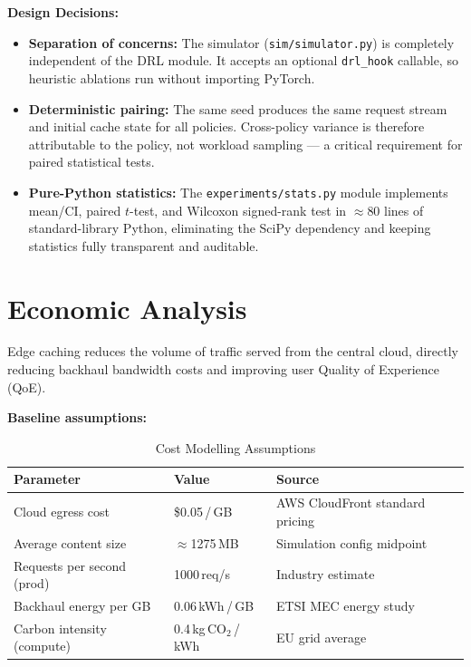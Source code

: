 \documentclass[12pt,a4paper]{report}
\begin{document}
\textbf{Design Decisions:}

\begin{itemize}
  \item \textbf{Separation of concerns:} The simulator (\texttt{sim/simulator.py}) is
        completely independent of the DRL module. It accepts an optional \texttt{drl\_hook}
        callable, so heuristic ablations run without importing PyTorch.
  \item \textbf{Deterministic pairing:} The same seed produces the same request stream
        and initial cache state for all policies. Cross-policy variance is therefore attributable
        to the policy, not workload sampling --- a critical requirement for paired statistical tests.
  \item \textbf{Pure-Python statistics:} The \texttt{experiments/stats.py} module implements
        mean/CI, paired $t$-test, and Wilcoxon signed-rank test in $\approx$80 lines of
        standard-library Python, eliminating the SciPy dependency and keeping statistics
        fully transparent and auditable.
\end{itemize}

\clearpage


\chapter{Economic Analysis}
\label{ch:economic}

Edge caching reduces the volume of traffic served from the central cloud, directly reducing
backhaul bandwidth costs and improving user Quality of Experience (QoE).

\textbf{Baseline assumptions:}

\begin{table}[H]
\centering
\caption{Cost Modelling Assumptions}
\label{tab:costassump}
\renewcommand{\arraystretch}{1.3}
\begin{tabular}{L{6cm} L{4cm} L{4cm}}
\toprule
\textbf{Parameter} & \textbf{Value} & \textbf{Source}\\
\midrule
Cloud egress cost         & \$0.05\,/\,GB              & AWS CloudFront standard pricing\\
Average content size      & $\approx$1275\,MB           & Simulation config midpoint\\
Requests per second (prod)& 1000\,req/s                 & Industry estimate\\
Backhaul energy per GB    & 0.06\,kWh\,/\,GB           & ETSI MEC energy study\\
Carbon intensity (compute)& 0.4\,kg\,CO$_2$\,/\,kWh   & EU grid average\\
\bottomrule
\end{tabular}
\end{table}
\end{document}

